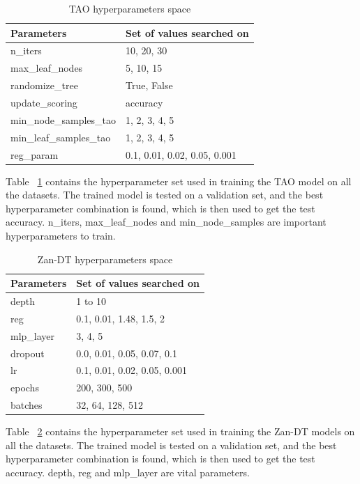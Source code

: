 \documentclass{article} %
\renewcommand{\>}{{\rightarrow}}
\renewcommand{\=}{\stackrel{\triangle}{=}}
\newcommand{\0}{{\mathbf 0}}
\begin{document}
\begin{table}[htbp]
\caption{TAO hyperparameters space}
\label{tao-hyp}
\begin{center}
\begin{tabular}{|p{4cm}|p{8cm}|}
\hline
Parameters &Set of values searched on\\
 \hline
n\_iters &10, 20, 30\\
max\_leaf\_nodes &5, 10, 15\\
randomize\_tree &True, False\\
update\_scoring &accuracy\\
min\_node\_samples\_tao &1, 2, 3, 4, 5\\
min\_leaf\_samples\_tao &1, 2, 3, 4, 5\\
reg\_param &0.1, 0.01, 0.02, 0.05, 0.001\\
\hline 
\end{tabular}
\end{center}
\end{table}

Table ~\ref{tao-hyp} contains the hyperparameter set used in training the TAO model on all the datasets. The trained model is tested on a validation set, and the best hyperparameter combination is found, which is then used to get the test accuracy. n\_iters, max\_leaf\_nodes and min\_node\_samples are important hyperparameters to train.

\begin{table}[htbp]
\caption{Zan-DT hyperparameters space}
\label{zan-hyp}
\begin{center}
\begin{tabular}{|p{4cm}|p{8cm}|}
\hline
Parameters &Set of values searched on\\
 \hline
depth &1 to 10\\
reg &0.1, 0.01, 1.48, 1.5, 2\\
mlp\_layer &3, 4, 5\\
dropout &0.0, 0.01, 0.05, 0.07, 0.1\\
lr &0.1, 0.01, 0.02, 0.05, 0.001\\
epochs   &200, 300, 500\\
batches  &32, 64, 128, 512\\
\hline 
\end{tabular}
\end{center}
\end{table}

Table ~\ref{zan-hyp} contains the hyperparameter set used in training the Zan-DT models on all the datasets. The trained model is tested on a validation set, and the best hyperparameter combination is found, which is then used to get the test accuracy. depth, reg and mlp\_layer are vital parameters.
\end{document}
